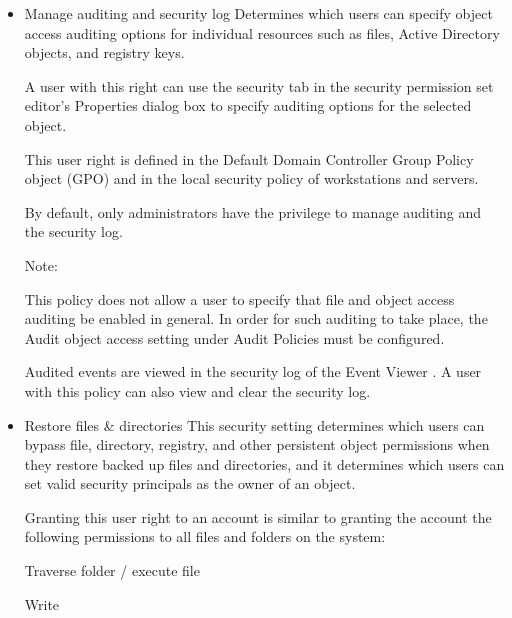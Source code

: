 \begin{itemize}
    \item Manage auditing and security log
Determines which users can specify object access auditing options for individual resources such as files, Active Directory objects, and registry keys.

A user with this right can use the security tab in the security permission set editor’s Properties dialog box to specify auditing options for the selected object.

This user right is defined in the Default Domain Controller Group Policy object (GPO) and in the local security policy of workstations and servers.

By default, only administrators have the privilege to manage auditing and the security log.

 Note:

This policy does not allow a user to specify that file and object access auditing be enabled in general. In order for such auditing to take place, the Audit object access setting under Audit Policies must be configured.

Audited events are viewed in the security log of the Event Viewer . A user with this policy can also view and clear the security log.

    \item Restore files \& directories
This security setting determines which users can bypass file, directory, registry, and other persistent object permissions when they restore backed up files and directories, and it determines which users can set valid security principals as the owner of an object.

Granting this user right to an account is similar to granting the account the following permissions to all files and folders on the system:

Traverse folder / execute file

Write


\end{itemize}

